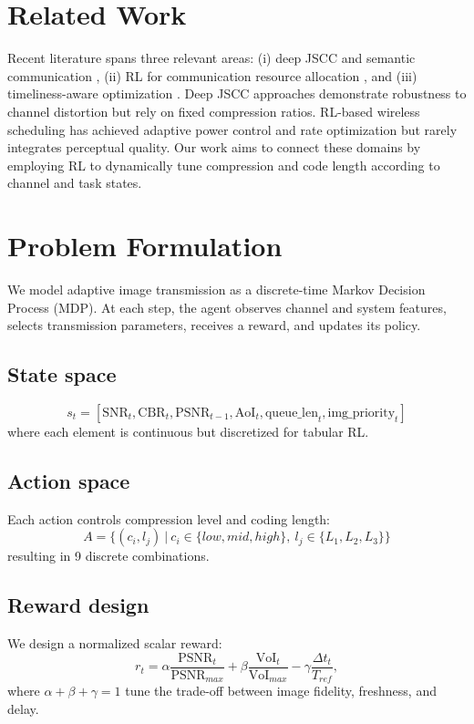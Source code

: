 \documentclass[conference]{IEEEtran}
\begin{document}
\section{Related Work}
Recent literature spans three relevant areas: (i) deep JSCC and semantic communication \cite{kurka2021bandwidth, liu2021swin}, (ii) RL for communication resource allocation \cite{mnih2015human, schulman2017ppo}, and (iii) timeliness-aware optimization \cite{bian2023deepjsccpp, yang2025timeliness}. Deep JSCC approaches demonstrate robustness to channel distortion but rely on fixed compression ratios. RL-based wireless scheduling has achieved adaptive power control and rate optimization but rarely integrates perceptual quality. Our work aims to connect these domains by employing RL to dynamically tune compression and code length according to channel and task states.

\section{Problem Formulation}
We model adaptive image transmission as a discrete-time Markov Decision Process (MDP). At each step, the agent observes channel and system features, selects transmission parameters, receives a reward, and updates its policy. 

\subsection{State space}
\[
s_t = [\text{SNR}_t, \text{CBR}_t, \text{PSNR}_{t-1}, \text{AoI}_t, \text{queue\_len}_t, \text{img\_priority}_t]
\]
where each element is continuous but discretized for tabular RL.

\subsection{Action space}
Each action controls compression level and coding length:
\[
A = \{(c_i,l_j)\ |\ c_i \in \{low,mid,high\},\ l_j \in \{L_1,L_2,L_3\}\}
\]
resulting in 9 discrete combinations.

\subsection{Reward design}
We design a normalized scalar reward:
\begin{equation}
r_t = \alpha \frac{\text{PSNR}_t}{\text{PSNR}_{max}} + 
\beta \frac{\text{VoI}_t}{\text{VoI}_{max}} -
\gamma \frac{\Delta t_t}{T_{ref}},
\end{equation}
where $\alpha+\beta+\gamma=1$ tune the trade-off between image fidelity, freshness, and delay.
\end{document}
